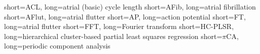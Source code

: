 


\usepackage{enumitem}
\newlength\myitemwidth

\setlength\myitemwidth{9em} 						%







  		{short={ACL},		long={atrial (basic) cycle length}}
  		{short={AFib},		long={atrial fibrillation}}
  		{short={AFlut},		long={atrial flutter}}
  		{short={AP},			long={action potential}}
  		{short={FT},			long={atrial flutter}}
  		{short={FFT},		long={Fourier transform}}
  	{short={HC-PLSR},	long={hierarchical cluster-based partial least squares regression}}
  		{short={$\pi$CA},	long={periodic component analysis}}
